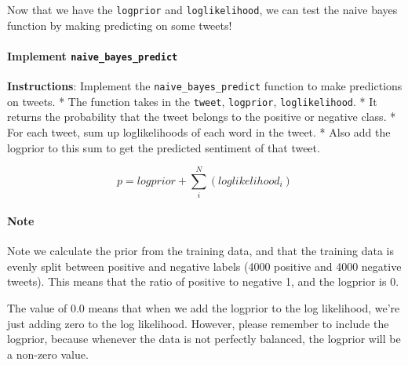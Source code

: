 \documentclass[11pt]{article}
\begin{document}
Now that we have the \texttt{logprior} and \texttt{loglikelihood}, we
can test the naive bayes function by making predicting on some tweets!

\hypertarget{implement-naive_bayes_predict}{%
\paragraph{\texorpdfstring{Implement
\texttt{naive\_bayes\_predict}}{Implement naive\_bayes\_predict}}\label{implement-naive_bayes_predict}}

\textbf{Instructions}: Implement the \texttt{naive\_bayes\_predict}
function to make predictions on tweets. * The function takes in the
\texttt{tweet}, \texttt{logprior}, \texttt{loglikelihood}. * It returns
the probability that the tweet belongs to the positive or negative
class. * For each tweet, sum up loglikelihoods of each word in the
tweet. * Also add the logprior to this sum to get the predicted
sentiment of that tweet.

\[ p = logprior + \sum_i^N (loglikelihood_i)\]

\hypertarget{note}{%
\paragraph{Note}\label{note}}

Note we calculate the prior from the training data, and that the
training data is evenly split between positive and negative labels (4000
positive and 4000 negative tweets). This means that the ratio of
positive to negative 1, and the logprior is 0.

The value of 0.0 means that when we add the logprior to the log
likelihood, we're just adding zero to the log likelihood. However,
please remember to include the logprior, because whenever the data is
not perfectly balanced, the logprior will be a non-zero value.
\end{document}
